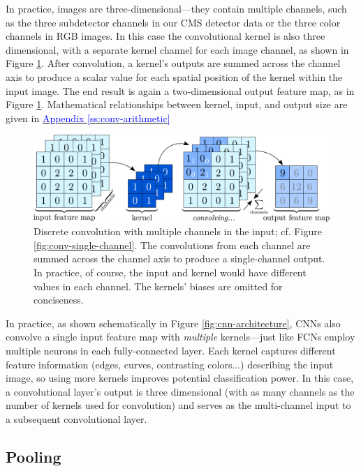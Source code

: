 \documentclass[11pt, a4paper]{article}
\newcommand{\myhref}[2]{\hyperref[#1]{\textcolor{blue}{#2}}}
\begin{document}
In practice, images are three-dimensional---they contain multiple channels, such as the three subdetector channels in our CMS detector data or the three color channels in RGB images. In this case the convolutional kernel is also three dimensional, with a separate kernel channel for each image channel, as shown in Figure \ref{fig:conv-multi-channel}. After convolution, a kernel's outputs are summed across the channel axis to produce a scalar value for each spatial position of the kernel within the input image. The end result is again a two-dimensional output feature map, as in Figure \ref{fig:conv-multi-channel}. Mathematical relationships between kernel, input, and output size are given in \myhref{ss:conv-arithmetic}{Appendix \ref{ss:conv-arithmetic}}

\begin{figure}[htb!]
    \centering
    \includegraphics[width=0.9\linewidth]{vector/conv-multi-channel.pdf}
    \caption{Discrete convolution with multiple channels in the input; cf. Figure \ref{fig:conv-single-channel}. The convolutions from each channel are summed across the channel axis to produce a single-channel output. In practice, of course, the input and kernel would have different values in each channel. The kernels' biases are omitted for conciseness.}
    \label{fig:conv-multi-channel}
\end{figure}

In practice, as shown schematically in Figure \ref{fig:cnn-architecture}, CNNs also convolve a single input feature map with \textit{multiple} kernels---just like FCNs employ multiple neurons in each fully-connected layer. Each kernel captures different feature information (edges, curves, contrasting colors...) describing the input image, so using more kernels improves potential classification power. In this case, a convolutional layer's output is three dimensional (with as many channels as the number of kernels used for convolution) and serves as the multi-channel input to a subsequent convolutional layer.

\subsection{Pooling}
\end{document}
